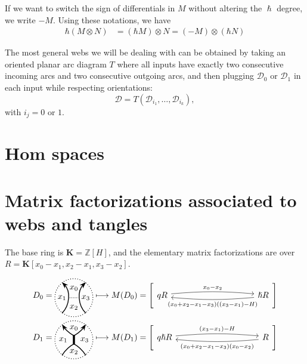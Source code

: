 \documentclass{article}
\newcommand{\Z}{\mathbb{Z}}
\newcommand{\DD}{\mathcal{D}}
\DeclareMathOperator{\Ext}{Ext}
\newcommand{\mf}[4]{%
  \begin{tikzcd}[column sep=3.5cm, ampersand replacement=\&]
    {#1} \arrow[r, "#3", shift left=0.5ex, bend left=5,start anchor=east, end anchor=west] \arrow[r, leftarrow, "#4", shift right=0.5ex, bend right=5, swap, start anchor=east, end anchor=west] \& 
    {#2}
  \end{tikzcd}%
}
\theoremstyle{plain} %
\newtheorem{lemma}[theorem]{Lemma}
\theoremstyle{definition} %
\theoremstyle{remark} %
\begin{document}
If we want to switch the sign of differentials in $M$ without altering the $\hslash$ degree, we write $-M$. Using these notations, we have 
\begin{align*}
    \hbar (M\otimes N) &= (\hbar M)\otimes N = (-M)\otimes(\hbar N)
\end{align*}



The most general webs we will be dealing with can be obtained by taking an oriented planar arc diagram $T$ where all inputs have exactly two consecutive incoming arcs and two consecutive outgoing arcs, and then plugging $\DD_0$ or $\DD_1$ in each input while respecting orientations:
$$\DD=T(\DD_{i_1},\dots,\DD_{i_k}),$$ 
with $i_j=0$ or $1$.

\section{Hom spaces}

%
%

%
%

\section{Matrix factorizations associated to webs and tangles}
The base ring is $\mathbf K=\Z[H]$, and the elementary matrix factorizations are over $R=\mathbf K[x_0-x_1,x_2-x_1,x_3-x_2]$.

\begin{align*}
	D_0=\ThinEdgeStandard 
	&\longmapsto M(D_0)=\left[\mf{q R}{\hslash R}{x_0-x_2}{(x_0+x_2-x_1-x_3)((x_3-x_1)-H)}\right]
	\\
	D_1=\ThickEdgeStandard 
	&\longmapsto M(D_1)=\left[\mf{q \hslash R}{ R}{(x_3-x_1)-H}{(x_0+x_2-x_1-x_3)(x_0-x_2)}\right]
\end{align*}
\end{document}
